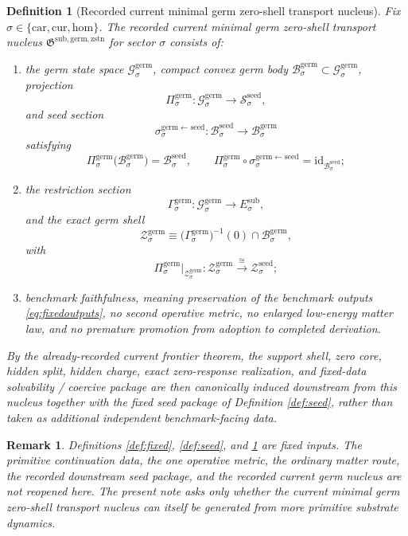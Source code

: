 \documentclass[11pt]{article}
\newcommand{\Car}{\mathrm{car}}
\newcommand{\Cur}{\mathrm{cur}}
\newcommand{\Hom}{\mathrm{hom}}
\newcommand{\SubTarget}[1]{E_{#1}^{\mathrm{sub}}}
\newcommand{\SeedState}[1]{\mathcal S_{#1}^{\mathrm{seed}}}
\newcommand{\SeedBody}[1]{\mathcal B_{#1}^{\mathrm{seed}}}
\newcommand{\SeedShell}[1]{\mathcal Z_{#1}^{\mathrm{seed}}}
\newcommand{\GermNucleus}{\mathfrak G^{\mathrm{sub,germ,zstn}}}
\newcommand{\GermState}[1]{\mathcal G_{#1}^{\mathrm{germ}}}
\newcommand{\GermBody}[1]{\mathcal B_{#1}^{\mathrm{germ}}}
\newcommand{\GermProj}[1]{\Pi_{#1}^{\mathrm{germ}}}
\newcommand{\GermSeedSec}[1]{\sigma_{#1}^{\mathrm{germ\leftarrow seed}}}
\newcommand{\GermSection}[1]{\Gamma_{#1}^{\mathrm{germ}}}
\newcommand{\GermShell}[1]{\mathcal Z_{#1}^{\mathrm{germ}}}
\newtheorem{definition}{Definition}
\newtheorem{remark}{Remark}
\begin{document}
\begin{definition}[Recorded current minimal germ zero-shell transport nucleus]
\label{def:nucleus}
Fix \(\sigma\in\{\Car,\Cur,\Hom\}\). The recorded current minimal germ zero-shell transport nucleus \(\GermNucleus\) for sector \(\sigma\) consists of:
\begin{enumerate}
    \item the germ state space \(\GermState{\sigma}\), compact convex germ body \(\GermBody{\sigma}\subset\GermState{\sigma}\), projection
    \[
    \GermProj{\sigma}:\GermState{\sigma}\to\SeedState{\sigma},
    \]
    and seed section
    \[
    \GermSeedSec{\sigma}:\SeedBody{\sigma}\to\GermBody{\sigma}
    \]
    satisfying
    \[
    \GermProj{\sigma}\bigl(\GermBody{\sigma}\bigr)=\SeedBody{\sigma},
    \qquad
    \GermProj{\sigma}\circ\GermSeedSec{\sigma}
    =
    \mathrm{id}_{\SeedBody{\sigma}};
    \]
    \item the restriction section
    \[
    \GermSection{\sigma}:\GermState{\sigma}\to\SubTarget{\sigma},
    \]
    and the exact germ shell
    \[
    \GermShell{\sigma}
    \equiv
    \bigl(\GermSection{\sigma}\bigr)^{-1}(0)\cap\GermBody{\sigma},
    \]
    with
    \[
    \GermProj{\sigma}\big|_{\GermShell{\sigma}}
    :
    \GermShell{\sigma}
    \xrightarrow{\cong}
    \SeedShell{\sigma};
    \]
    \item benchmark faithfulness, meaning preservation of the benchmark outputs \eqref{eq:fixedoutputs}, no second operative metric, no enlarged low-energy matter law, and no premature promotion from adoption to completed derivation.
\end{enumerate}
By the already-recorded current frontier theorem, the support shell, zero core, hidden split, hidden charge, exact zero-response realization, and fixed-data solvability / coercive package are then canonically induced downstream from this nucleus together with the fixed seed package of Definition \ref{def:seed}, rather than taken as additional independent benchmark-facing data.
\end{definition}

\begin{remark}
Definitions \ref{def:fixed}, \ref{def:seed}, and \ref{def:nucleus} are fixed inputs. The primitive continuation data, the one operative metric, the ordinary matter route, the recorded downstream seed package, and the recorded current germ nucleus are not reopened here. The present note asks only whether the current minimal germ zero-shell transport nucleus can itself be generated from more primitive substrate dynamics.
\end{remark}
\end{document}

